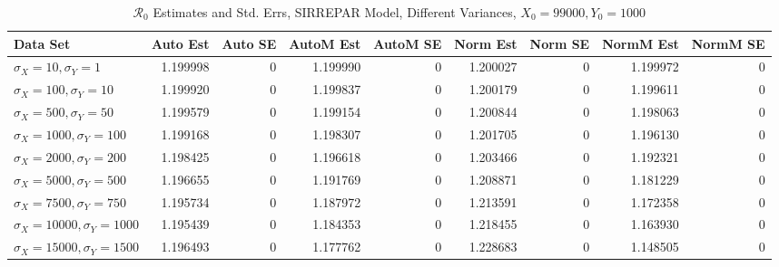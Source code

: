 \documentclass[12pt]{article}
\newcommand{\rr}{\ensuremath{\mathcal{R}_0}}
\begin{document}
\begin{table} [H]
	
	\caption{$\rr$ Estimates and Std. Errs, SIRREPAR Model,
		Different Variances, 
		$X_0 = 99000, Y_0 = 1000$}
	\begin{footnotesize}
		\hskip -1.7cm
		\begin{tabular}{l|r|r|r|r|r|r|r|r}
			\hline
			Data Set & Auto Est & Auto SE & AutoM Est & AutoM SE & Norm Est & Norm SE & NormM Est & NormM SE\\
			\hline
			$\sigma_X = 10, \sigma_Y = 1$ & 1.199998 & 0 & 1.199990 & 0 & 1.200027 & 0 & 1.199972 & 0\\
			\hline
			$\sigma_X = 100, \sigma_Y = 10$ & 1.199920 & 0 & 1.199837 & 0 & 1.200179 & 0 & 1.199611 & 0\\
			\hline
			$\sigma_X = 500, \sigma_Y = 50$ & 1.199579 & 0 & 1.199154 & 0 & 1.200844 & 0 & 1.198063 & 0\\
			\hline
			$\sigma_X = 1000, \sigma_Y = 100$ & 1.199168 & 0 & 1.198307 & 0 & 1.201705 & 0 & 1.196130 & 0\\
			\hline
			$\sigma_X = 2000, \sigma_Y = 200$ & 1.198425 & 0 & 1.196618 & 0 & 1.203466 & 0 & 1.192321 & 0\\
			\hline
			$\sigma_X = 5000, \sigma_Y = 500$ & 1.196655 & 0 & 1.191769 & 0 & 1.208871 & 0 & 1.181229 & 0\\
			\hline
			$\sigma_X = 7500, \sigma_Y = 750$ & 1.195734 & 0 & 1.187972 & 0 & 1.213591 & 0 & 1.172358 & 0\\
			\hline
			$\sigma_X = 10000, \sigma_Y = 1000$ & 1.195439 & 0 & 1.184353 & 0 & 1.218455 & 0 & 1.163930 & 0\\
			\hline
			$\sigma_X = 15000, \sigma_Y = 1500$ & 1.196493 & 0 & 1.177762 & 0 & 1.228683 & 0 & 1.148505 & 0\\
			\hline
		\end{tabular}
	\end{footnotesize}
\end{table}
\end{document}
